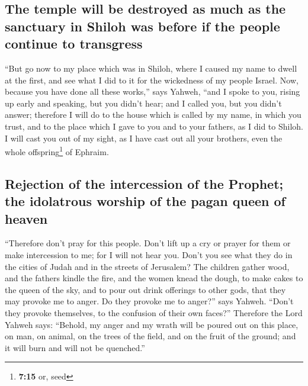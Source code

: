 \hypertarget{the-temple-will-be-destroyed-as-much-as-the-sanctuary-in-shiloh-was-before-if-the-people-continue-to-transgress}{%
\subsection{The temple will be destroyed as much as the sanctuary in
Shiloh was before if the people continue to
transgress}\label{the-temple-will-be-destroyed-as-much-as-the-sanctuary-in-shiloh-was-before-if-the-people-continue-to-transgress}}

 ``But go now to my place which was in Shiloh, where I
caused my name to dwell at the first, and see what I did to it for the
wickedness of my people Israel.  Now, because you have
done all these works,'' says Yahweh, ``and I spoke to you, rising up
early and speaking, but you didn't hear; and I called you, but you
didn't answer;  therefore I will do to the house which is
called by my name, in which you trust, and to the place which I gave to
you and to your fathers, as I did to Shiloh.  I will cast
you out of my sight, as I have cast out all your brothers, even the
whole offspring\footnote{\textbf{7:15} or, seed} of Ephraim.

\hypertarget{rejection-of-the-intercession-of-the-prophet-the-idolatrous-worship-of-the-pagan-queen-of-heaven}{%
\subsection{Rejection of the intercession of the Prophet; the idolatrous
worship of the pagan queen of
heaven}\label{rejection-of-the-intercession-of-the-prophet-the-idolatrous-worship-of-the-pagan-queen-of-heaven}}

 ``Therefore don't pray for this people. Don't lift up a
cry or prayer for them or make intercession to me; for I will not hear
you.  Don't you see what they do in the cities of Judah
and in the streets of Jerusalem?  The children gather
wood, and the fathers kindle the fire, and the women knead the dough, to
make cakes to the queen of the sky, and to pour out drink offerings to
other gods, that they may provoke me to anger.  Do they
provoke me to anger?'' says Yahweh. ``Don't they provoke themselves, to
the confusion of their own faces?''  Therefore the Lord
Yahweh says: ``Behold, my anger and my wrath will be poured out on this
place, on man, on animal, on the trees of the field, and on the fruit of
the ground; and it will burn and will not be quenched.''

